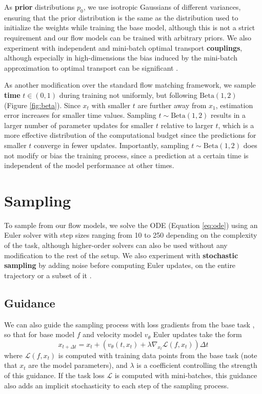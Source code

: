 As \textbf{prior} distributions $p_0$, we use isotropic Gaussians of different variances, ensuring that the prior distribution is the same as the distribution used to initialize the weights while training the base model, although this is not a strict requirement and our flow models can be trained with arbitrary priors. We also experiment with independent and mini-batch optimal transport \textbf{couplings}, although especially in high-dimensions the bias induced by the mini-batch approximation to optimal transport can be significant \citep{fatrasMinibatchOptimalTransport2021}. 

As another modification over the standard flow matching framework, we sample \textbf{time} $t \in (0,1)$  during training not uniformly, but following $\text{Beta}(1,2)$ (Figure \ref{fig:beta}). Since $x_t$ with smaller $t$ are further away from $x_1$, estimation error increases for smaller time values. Sampling $t \sim \text{Beta}(1,2)$ results in a larger number of parameter updates for smaller $t$ relative to larger $t$, which is a more effective distribution of the computational budget since the predictions for smaller $t$ converge in fewer updates. Importantly, sampling $t \sim \text{Beta}(1,2)$ does not modify or bias the training process, since a prediction at a certain time is independent of the model performance at other times. 

\section{Sampling}

To sample from our flow models, we solve the ODE (Equation \ref{eq:ode}) using an Euler solver with step sizes ranging from 10 to 250 depending on the complexity of the task, although higher-order solvers can also be used without any modification to the rest of the setup. We also experiment with \textbf{stochastic sampling} by adding noise before computing Euler updates, on the entire trajectory or a subset of it \citep{karrasElucidatingDesignSpace}. 

\subsection{Guidance}

We can also guide the sampling process with loss gradients from the base task \citep{wangProteinConformationGeneration2024,kulyteImprovingAntibodyDesign2024,yuForceGuidedBridgeMatching2024a}, so that for base model $f$ and velocity model $v_\theta$ Euler updates take the form 
\begin{equation}
    x_{t + \Delta t} = x_t + \left( v_\theta(t, x_t) + \lambda \nabla_{x_t}\mathcal{L}(f, x_t) \right) \Delta t
\end{equation}
where $\mathcal{L}(f, x_t)$ is computed with training data points from the base task (note that $x_t$ are the model parameters), and $\lambda$ is a coefficient controlling the strength of this guidance. If the task loss $\mathcal{L}$ is computed with mini-batches, this guidance also adds an implicit stochasticity to each step of the sampling process. 

